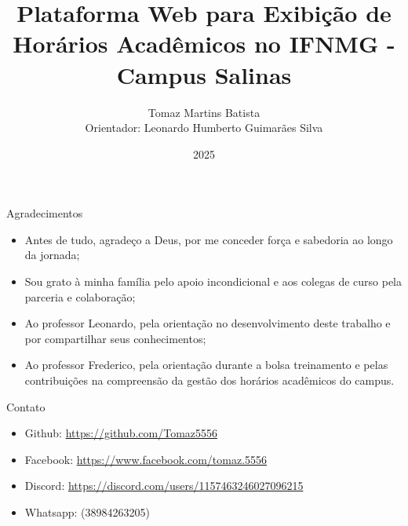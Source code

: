 \documentclass[handout,t]{beamer}
\title[Trabalho de Conclusão de Curso]{
	Plataforma Web para Exibição de Horários Acadêmicos no IFNMG - Campus Salinas}
\date{
	2025}
\author[Autor: Tomaz Martins Batista]{
	Tomaz Martins Batista\\
	Orientador: Leonardo Humberto Guimarães Silva\\
	\vspace{0.5cm}}
\institute[]{
	Bacharelado em Sistemas de informação\\
	Instituto Federal do Norte de Minas Gerais - Campus Salinas\\
	\vspace{0.5cm}}
\begin{document}
\frame{\titlepage}
\section[]{}





%

%

%



%

\section{}
\begin{frame}{Agradecimentos}
	\begin{itemize}
		\item Antes de tudo, agradeço a Deus, por me conceder força e sabedoria ao longo da jornada; \vspace{0.5cm}
		\item Sou grato à minha família pelo apoio incondicional e aos colegas de curso pela parceria e colaboração; \vspace{0.5cm}
		\item Ao professor Leonardo, pela orientação no desenvolvimento deste trabalho e por compartilhar seus conhecimentos; \vspace{0.5cm}
		\item Ao professor Frederico, pela orientação durante a bolsa treinamento e pelas contribuições na compreensão da gestão dos horários acadêmicos do campus. \vspace{0.5cm}
	\end{itemize}
\end{frame}

\begin{frame}{Contato}
	\begin{itemize}
		\item Github: \url{https://github.com/Tomaz5556} \vspace{0.5cm}
		\item Facebook: \url{https://www.facebook.com/tomaz.5556} \vspace{0.5cm}
		\item Discord: \url{https://discord.com/users/1157463246027096215} \vspace{0.5cm}
		\item Whatsapp: (38984263205) \vspace{0.5cm}
	\end{itemize}
\end{frame}
\end{document}
